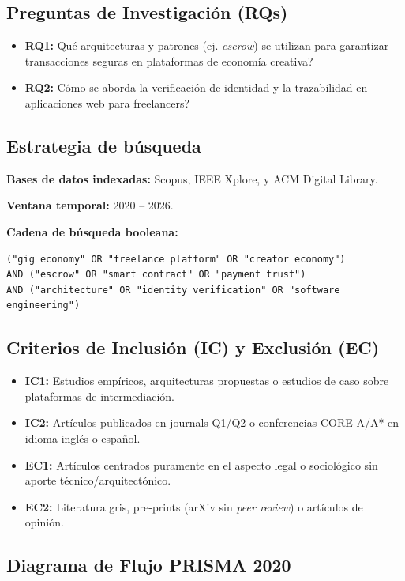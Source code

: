 \subsection{Preguntas de Investigaci\'on (RQs)}
\begin{itemize}
  \item \textbf{RQ1:} \textquestiondown Qu\'e arquitecturas y patrones (ej. \emph{escrow})
    se utilizan para garantizar transacciones seguras en plataformas de
    econom\'ia creativa?
  \item \textbf{RQ2:} \textquestiondown C\'omo se aborda la verificaci\'on de identidad y la
    trazabilidad en aplicaciones web para freelancers?
\end{itemize}

\subsection{Estrategia de b\'usqueda}
\textbf{Bases de datos indexadas:} Scopus, IEEE Xplore, y ACM Digital Library.

\textbf{Ventana temporal:} 2020 -- 2026.

\textbf{Cadena de b\'usqueda booleana:}
\begin{verbatim}
("gig economy" OR "freelance platform" OR "creator economy")
AND ("escrow" OR "smart contract" OR "payment trust")
AND ("architecture" OR "identity verification" OR "software engineering")
\end{verbatim}

\subsection{Criterios de Inclusi\'on (IC) y Exclusi\'on (EC)}
\begin{itemize}
  \item \textbf{IC1:} Estudios emp\'iricos, arquitecturas propuestas o
    estudios de caso sobre plataformas de intermediaci\'on.
  \item \textbf{IC2:} Art\'iculos publicados en journals Q1/Q2 o
    conferencias CORE A/A* en idioma ingl\'es o espa\~nol.
  \item \textbf{EC1:} Art\'iculos centrados puramente en el aspecto legal o
    sociol\'ogico sin aporte t\'ecnico/arquitect\'onico.
  \item \textbf{EC2:} Literatura gris, pre-prints (arXiv sin \emph{peer
    review}) o art\'iculos de opini\'on.
\end{itemize}

\subsection{Diagrama de Flujo PRISMA 2020}

